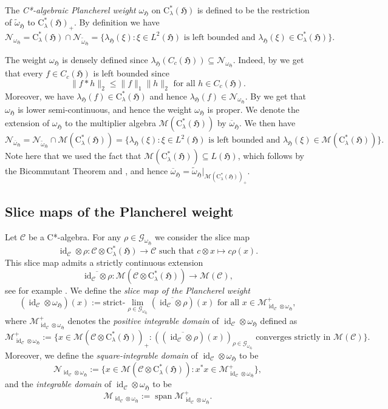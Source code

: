 \documentclass[11pt,final]{amsart}
\numberwithin{equation}{section}
\theoremstyle{plain}
\theoremstyle{definition}
\theoremstyle{remark}
\newcommand{\C}{{\mathcal{C}}}
\newcommand{\G}{{\mathcal{G}}}
\newcommand{\M}{{\mathcal{M}}}
\newcommand{\N}{{\mathcal{N}}}
\def\la{\lambda}
\def\om{\omega}
\newcommand{\fH}{{\mathfrak{H}}}
\newcommand{\foral}{\text{ for all }}
\newcommand{\ca}{\mathrm{C}^*}
\newcommand{\ol}{\overline}
\newcommand{\wt}{\widetilde}
\newcommand{\id}{{\operatorname{id}}}
\newcommand{\spn}{\operatorname{span}}
\begin{document}
The \emph{C*-algebraic Plancherel weight}
$\om_{\fH}$ on $\ca_{\la}(\fH)$ is defined to be the restriction of $\wt{\om}_{\fH}$ to
$\ca_{\la}(\fH)_+$.
By definition we have 
\[
\N_{\om_{\fH}}=\ca_\la(\fH)\cap \N_{\wt{\om}_{\fH}}= \{ \la_{\fH}(\xi): \xi \in L^2(\fH) \text{ is left bounded and }\la_{\fH}(\xi)\in \ca_\la(\fH)\}.
\]

The weight $\om_{\fH}$ is densely defined since $\la_{\fH}(C_c(\fH)) \subseteq \N_{\om_{\fH}}$. Indeed, by  \cite[Proposition 2.40]{Fol16} we get that every $f\in C_c(\fH)$ is left bounded since
\[
\|f\ast h\|_2 \leq \|f\|_1 \|h\|_2 \foral h \in C_c(\fH).
\]
Moreover, we have $\la_{\fH}(f)\in \ca_\la(\fH)$ and hence $\la_{\fH}(f)\in\N_{\om_{\fH}}$. 
By \cite[Theorem~VII.1.11]{Tak03} we get that $\om_{\fH}$ is lower semi-continuous, and hence the weight $\om_\fH$ is proper.
We denote the extension of $\om_{\fH}$ to the multiplier algebra $\M(\ca_\la(\fH))$ by $\ol{\om}_{\fH}$. We then have
\[
\N_{\ol{\om}_{\fH}}=\N_{\wt{\om}_{\fH}} \cap \M(\ca_\la(\fH))=\{ \la_{\fH}(\xi): \xi \in L^2(\fH) \text{ is left bounded and }\la_{\fH}(\xi)\in \M(\ca_\la(\fH))\}.
\]
Note here that we used the fact that $\M(\ca_\la(\fH))\subseteq L(\fH)$, which follows by the Bicommutant Theorem and \cite[Proposition 3.12.3]{Ped79}, and hence $\ol{\om}_{\fH}=\wt{\om}_{\fH}|_{\M(\ca_\la(\fH))_+}$.

\subsection{Slice maps of the Plancherel weight}
Let $\C$ be a C*-algebra. For any $\rho \in \G_{\om_{\fH}}$ we consider the slice map 
\[
\id_\C \otimes \rho \colon \C \otimes \ca_\la(\fH) \to \C \text{ such that } c\otimes x \mapsto c \rho(x).
\]
This slice map admits a strictly continuous extension  
\[
\ol{\id_\C \otimes \rho} \colon \M(\C \otimes \ca_\la(\fH)) \to \M(\C),
\]
see for example \cite[Lemma~A.30]{EKQR06}.
We define the \emph{slice map of the Plancherel weight}
\[
(\id_{\C}\otimes \om_{\fH})(x):= \text{strict-}\lim_{\rho \in \G_{\om_{\fH}}} (\ol{\id_\C \otimes \rho})(x) \foral x\in \M_{\id_{\C}\otimes \om_{\fH}}^+,
\]
where $\M_{\id_{\C}\otimes \om_{\fH}}^+$ denotes the \emph{positive integrable domain} of $\id_{\C}\otimes \om_{\fH}$ defined as
\[
\M_{\id_{\C}\otimes \om_{\fH}}^+:= \{ x\in \M(\C \otimes \ca_\la(\fH))_+: \left((\ol{\id_\C \otimes \rho})(x)\right)_{\rho \in \G_{\om_{\fH}}} \text{ converges strictly in } \M(\C)\}.
\]
Moreover, we define the \emph{square-integrable domain} of $\id_{\C}\otimes \om_{\fH}$ to be
\[
\N_{\id_{\C}\otimes \om_{\fH}}:=\{ x\in \M(\C\otimes \ca_\la(\fH)): x^*x \in \M_{\id_{\C}\otimes \om_{\fH}}^+\},
\]
and the \emph{integrable domain} of $\id_{\C}\otimes \om_{\fH}$ to be
\[
\M_{\id_{\C}\otimes \om_{\fH}}:=\spn \M_{\id_{\C}\otimes \om_{\fH}}^+.
\]
\end{document}
